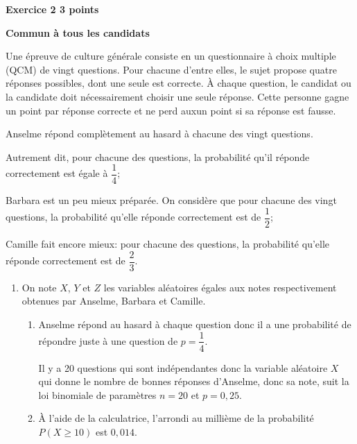 \documentclass[10pt,a4paper]{article}
\begin{document}
\textbf{Exercice 2 \hfill 3 points}

\medskip

\textbf{Commun à tous les candidats}

\bigskip

Une épreuve de culture générale consiste en un questionnaire à choix multiple (QCM) de vingt questions. Pour chacune d'entre elles, le sujet propose quatre réponses possibles, dont une seule est correcte. À chaque question, le candidat ou la candidate doit nécessairement choisir une seule réponse. Cette personne gagne un point par réponse correcte et ne perd auxun point si sa réponse est fausse.

\medskip

\begin{list}{\textbullet}{On considère trois candidats:}
\item Anselme répond complètement au hasard à chacune des vingt questions.

Autrement dit, pour chacune des questions, la probabilité qu'il réponde correctement est égale à $\dfrac{1}{4}$;
\item Barbara est un peu mieux préparée. On considère que pour chacune des vingt questions, la probabilité qu'elle réponde correctement est de $\dfrac{1}{2}$;
\item Camille fait encore mieux: pour chacune des questions, la probabilité qu'elle réponde correctement est de $\dfrac{2}{3}$.
\end{list}

\medskip

\begin{enumerate}
\item On note $X$, $Y$ et $Z$ les variables aléatoires égales aux notes respectivement obtenues par Anselme, Barbara et Camille.

\begin{enumerate}
\item %
Anselme répond au hasard à chaque question donc il a une probabilité de répondre juste à une question de $p=\dfrac{1}{4}$.

Il y a 20 questions qui sont indépendantes donc la variable aléatoire $X$ qui donne le nombre de bonnes réponses d'Anselme, donc sa note, suit la loi binomiale de paramètres $n=20$ et $p=0,25$.

\item À l'aide de la calculatrice, l'arrondi au millième de la probabilité $P(X \geqslant 10)$ est $0,014$.
\end{enumerate}
\end{enumerate}
\end{document}
